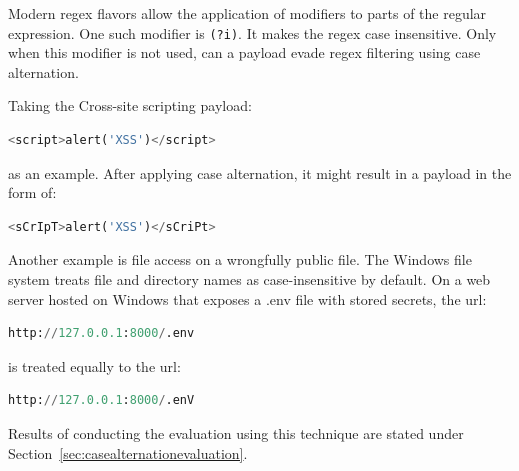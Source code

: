 Modern regex flavors allow the application of modifiers to parts of the regular expression.
One such modifier is \verb|(?i)|. It makes the regex case insensitive. \cite{regex/jan} Only when this modifier is not used, can a payload evade regex filtering using case alternation.

Taking the Cross-site scripting payload:

\begin{lstlisting}[style=basicStyle, language=Python]
<script>alert('XSS')</script>
\end{lstlisting}
as an example. After applying case alternation, it might result in a payload in the form of:

\begin{lstlisting}[style=basicStyle, language=Python]
<sCrIpT>alert('XSS')</sCriPt>
\end{lstlisting}

Another example is file access on a wrongfully public file.
The Windows file system treats file and directory names as case-insensitive by default. \cite{windows/casesensitive} On a web server hosted on Windows that exposes a .env file with stored secrets, the url:

\begin{lstlisting}[style=basicStyle, language=Python]
http://127.0.0.1:8000/.env
\end{lstlisting}
is treated equally to the url:

\begin{lstlisting}[style=basicStyle, language=Python]
http://127.0.0.1:8000/.enV
\end{lstlisting}

Results of conducting the evaluation using this technique are stated under Section~\ref{sec:casealternationevaluation}.




